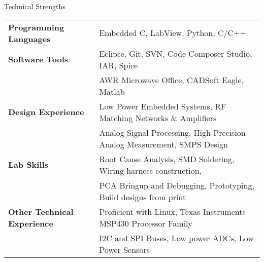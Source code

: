 \documentclass{resume} %
\begin{document}

\begin{rSection}{Technical Strengths}

\begin{tabular}{ @{} >{\bfseries}l @{\hspace{6ex}} l }
Programming Languages & Embedded C, LabView, Python, C/C++  \smallskip \\

Software Tools & Eclipse, Git, SVN, Code Composer Studio, IAR, Spice\\ 
 & AWR Microwave Office, CADSoft Eagle, Matlab \smallskip \\

Design Experience & Low Power Embedded Systems, RF Matching Networks \& Amplifiers\\
 & Analog Signal Processing, High Precision Analog Measurement, SMPS Design \smallskip \\
 
Lab Skills & Root Cause Analysis, SMD Soldering, Wiring harness construction,\\
& PCA Bringup and Debugging, Prototyping, Build designs from print\smallskip \\
 
Other Technical Experience & Proficient with Linux, Texas Instruments MSP430 Processor Family \\
& I2C and SPI Buses, Low power ADCs, Low Power Sensors\\
\end{tabular}

\end{rSection}
\medskip
\end{document}
